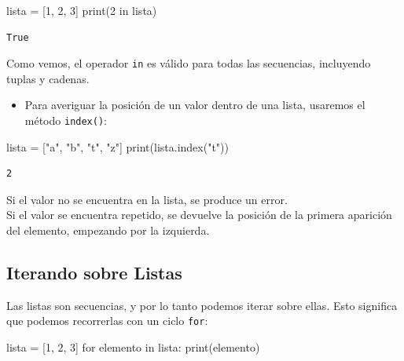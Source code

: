 \documentclass[
  letterpaper,
  DIV=11,
  numbers=noendperiod]{scrreprt}
\newenvironment{Shaded}{\begin{snugshade}}{\end{snugshade}}
\newcommand{\BuiltInTok}[1]{\textcolor[rgb]{0.00,0.23,0.31}{#1}}
\newcommand{\ControlFlowTok}[1]{\textcolor[rgb]{0.00,0.23,0.31}{#1}}
\newcommand{\DecValTok}[1]{\textcolor[rgb]{0.68,0.00,0.00}{#1}}
\newcommand{\KeywordTok}[1]{\textcolor[rgb]{0.00,0.23,0.31}{#1}}
\newcommand{\NormalTok}[1]{\textcolor[rgb]{0.00,0.23,0.31}{#1}}
\newcommand{\OperatorTok}[1]{\textcolor[rgb]{0.37,0.37,0.37}{#1}}
\newcommand{\StringTok}[1]{\textcolor[rgb]{0.13,0.47,0.30}{#1}}
\providecommand{\tightlist}{%
  \setlength{\itemsep}{0pt}\setlength{\parskip}{0pt}}\usepackage{longtable,booktabs,array}
\begin{document}
\begin{Shaded}
\begin{Highlighting}[]
\NormalTok{lista }\OperatorTok{=}\NormalTok{ [}\DecValTok{1}\NormalTok{, }\DecValTok{2}\NormalTok{, }\DecValTok{3}\NormalTok{]}
\BuiltInTok{print}\NormalTok{(}\DecValTok{2} \KeywordTok{in}\NormalTok{ lista)}
\end{Highlighting}
\end{Shaded}

\begin{verbatim}
True
\end{verbatim}

Como vemos, el operador \texttt{in} es válido para todas las secuencias,
incluyendo tuplas y cadenas.

\begin{itemize}
\tightlist
\item
  Para averiguar la posición de un valor dentro de una lista, usaremos
  el método \texttt{index()}:
\end{itemize}

\begin{Shaded}
\begin{Highlighting}[]
\NormalTok{lista }\OperatorTok{=}\NormalTok{ [}\StringTok{"a"}\NormalTok{, }\StringTok{"b"}\NormalTok{, }\StringTok{"t"}\NormalTok{, }\StringTok{"z"}\NormalTok{]}
\BuiltInTok{print}\NormalTok{(lista.index(}\StringTok{"t"}\NormalTok{))}
\end{Highlighting}
\end{Shaded}

\begin{verbatim}
2
\end{verbatim}

Si el valor no se encuentra en la lista, se produce un error.\\
Si el valor se encuentra repetido, se devuelve la posición de la primera
aparición del elemento, empezando por la izquierda.

\subsection{Iterando sobre Listas}\label{iterando-sobre-listas}

Las listas son secuencias, y por lo tanto podemos iterar sobre ellas.
Esto significa que podemos recorrerlas con un ciclo \texttt{for}:

\begin{Shaded}
\begin{Highlighting}[]
\NormalTok{lista }\OperatorTok{=}\NormalTok{ [}\DecValTok{1}\NormalTok{, }\DecValTok{2}\NormalTok{, }\DecValTok{3}\NormalTok{]}
\ControlFlowTok{for}\NormalTok{ elemento }\KeywordTok{in}\NormalTok{ lista:}
    \BuiltInTok{print}\NormalTok{(elemento)}
\end{Highlighting}
\end{Shaded}
\end{document}
